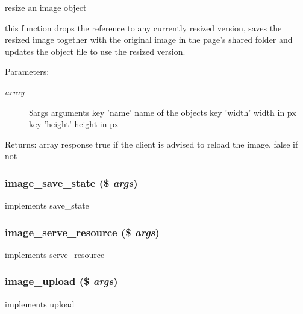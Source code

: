 resize an image object

this function drops the reference to any currently resized version, saves the resized image together with the original image in the page's shared folder and updates the object file to use the resized version. \begin{Desc}
\item[Parameters:]
\begin{description}
\item[{\em array}]\$args arguments key 'name' name of the objects key 'width' width in px key 'height' height in px \end{description}
\end{Desc}
\begin{Desc}
\item[Returns:]array response true if the client is advised to reload the image, false if not \end{Desc}
\hypertarget{module__image_8inc_8php_c26ea1448f0b7ed835907cf7c22b60ca}{
\subsubsection[{image\_\-save\_\-state}]{\setlength{\rightskip}{0pt plus 5cm}image\_\-save\_\-state (\$ {\em args})}}
\label{module__image_8inc_8php_c26ea1448f0b7ed835907cf7c22b60ca}


implements save\_\-state \hypertarget{module__image_8inc_8php_bb6646bfaa6a012e620cdaaa0bc3c807}{
\subsubsection[{image\_\-serve\_\-resource}]{\setlength{\rightskip}{0pt plus 5cm}image\_\-serve\_\-resource (\$ {\em args})}}
\label{module__image_8inc_8php_bb6646bfaa6a012e620cdaaa0bc3c807}


implements serve\_\-resource \hypertarget{module__image_8inc_8php_37dee9de60e2852c0631d8e60e58585c}{
\subsubsection[{image\_\-upload}]{\setlength{\rightskip}{0pt plus 5cm}image\_\-upload (\$ {\em args})}}
\label{module__image_8inc_8php_37dee9de60e2852c0631d8e60e58585c}


implements upload 
